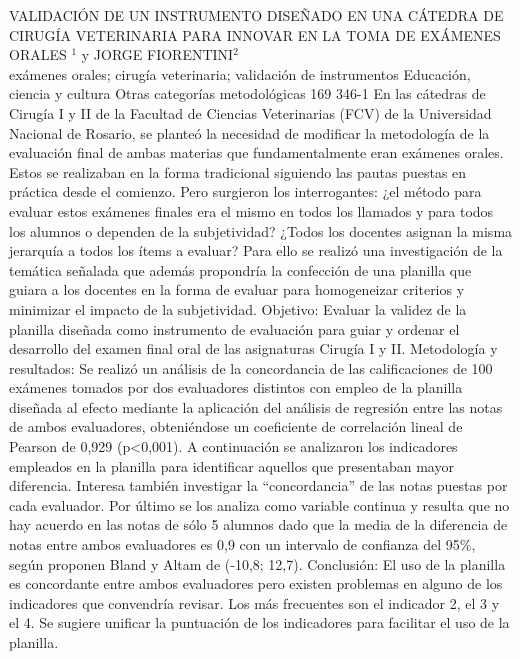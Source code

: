 \A
{VALIDACIÓN DE UN INSTRUMENTO DISEÑADO EN UNA CÁTEDRA DE CIRUGÍA VETERINARIA PARA INNOVAR EN LA TOMA DE EXÁMENES ORALES}
{$^1$ y JORGE FIORENTINI$^2$}
{
\\}
{exámenes orales; cirugía veterinaria; validación de instrumentos} 
 {Educación, ciencia y cultura} 
 {Otras categorías metodológicas} 
 {169} 
 {346-1}
{En las cátedras de Cirugía I y II de la Facultad de Ciencias Veterinarias (FCV) de la Universidad Nacional de Rosario, se planteó la necesidad de modificar la metodología de la evaluación final de ambas materias que fundamentalmente eran exámenes orales. Estos se realizaban en la forma tradicional siguiendo las pautas puestas en práctica desde el comienzo. Pero surgieron los interrogantes: ¿el método para evaluar estos exámenes finales era el mismo en todos los llamados y para todos los alumnos o dependen de la subjetividad? ¿Todos los docentes asignan la misma jerarquía a todos los ítems a evaluar? Para ello se realizó una investigación de la temática señalada que además propondría la confección de una planilla que guiara a los docentes en la forma de evaluar para homogeneizar criterios y minimizar el impacto de la subjetividad. Objetivo: Evaluar la validez de la planilla diseñada como instrumento de evaluación para guiar y ordenar el desarrollo del examen final oral de las asignaturas Cirugía I y II. Metodología y resultados: Se realizó un análisis de la concordancia de las calificaciones de 100 exámenes tomados por dos evaluadores distintos con empleo de la planilla diseñada al efecto mediante la aplicación del análisis de regresión entre las notas de ambos evaluadores, obteniéndose un coeficiente de correlación lineal de Pearson de 0,929 (p<0,001). A continuación se analizaron los indicadores empleados en la planilla para identificar aquellos que presentaban mayor diferencia. Interesa también investigar la “concordancia” de las notas puestas por cada evaluador. Por último se los analiza como variable continua y resulta que no hay acuerdo en las notas de sólo 5 alumnos dado que la media de la diferencia de notas entre ambos evaluadores es 0,9 con un intervalo de confianza del 95\%, según proponen Bland y Altam de (-10,8; 12,7). Conclusión: El uso de la planilla es concordante entre ambos evaluadores pero existen problemas en alguno de los indicadores que convendría revisar. Los más frecuentes son el indicador 2, el 3 y el 4. Se sugiere unificar la puntuación de los indicadores para facilitar el uso de la planilla. }
